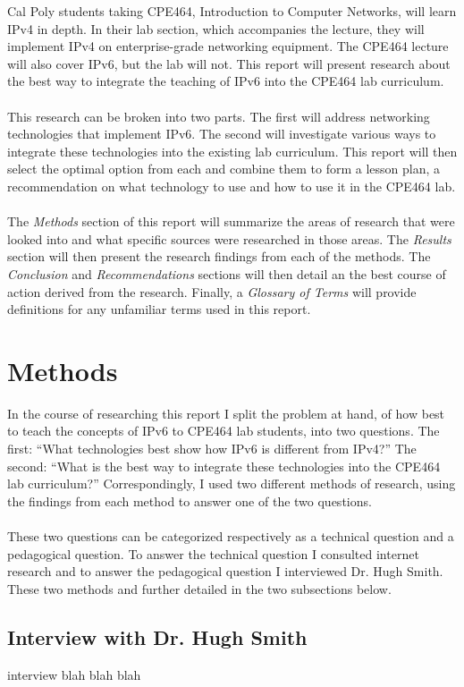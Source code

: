 \documentclass[12pt]{article}
\begin{document}
\noindent Cal Poly students taking CPE464, Introduction to Computer Networks, will learn IPv4 in depth. In their lab section, which accompanies the lecture, they will implement IPv4 on enterprise-grade networking equipment. The CPE464 lecture will also cover IPv6, but the lab will not. This report will present research about the best way to integrate the teaching of IPv6 into the CPE464 lab curriculum.\\\\
This research can be broken into two parts. The first will address networking technologies that implement IPv6. The second will investigate various ways to integrate these technologies into the existing lab curriculum. This report will then select the optimal option from each and combine them to form a lesson plan, a recommendation on what technology to use and how to use it in the CPE464 lab.\\\\
The \textit{Methods} section of this report will summarize the areas of research that were looked into and what specific sources were researched in those areas. The \textit{Results} section will then present the research findings from each of the methods. The \textit{Conclusion} and \textit{Recommendations} sections will then detail an the best course of action derived from the research. Finally, a \textit{Glossary of Terms} will provide definitions for any unfamiliar terms used in this report.

\section{Methods}
In the course of researching this report I split the problem at hand, of how best to teach the concepts of IPv6 to CPE464 lab students, into two questions. The first: ``What technologies best show how IPv6 is different from IPv4?'' The second: ``What is the best way to integrate these technologies into the CPE464 lab curriculum?'' Correspondingly, I used two different methods of research, using the findings from each method to answer one of the two questions.\\\\
These two questions can be categorized respectively as a technical question and a pedagogical question. To answer the technical question I consulted internet research and to answer the pedagogical question I interviewed Dr. Hugh Smith. These two methods and further detailed in the two subsections below.

\subsection{Interview with Dr. Hugh Smith}
interview blah blah blah
\end{document}
